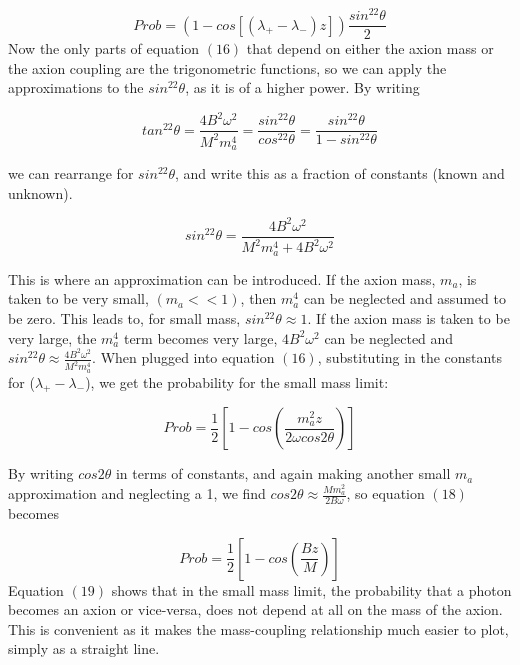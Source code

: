 \documentclass[12pt]{article}
\begin{document}
\begin{equation}
Prob = \left( 1 - cos[(\lambda_+-\lambda_-)z] \right) \frac{sin^22\theta}{2}
\end{equation}
Now the only parts of equation $(16)$ that depend on either the axion mass or the axion coupling are the trigonometric functions, so we can apply the approximations to the $sin^22\theta$, as it is of a higher power. By writing

\begin{equation*}
tan^22\theta = \frac{4B^2\omega^2}{M^2m_a^4} = \frac{sin^22\theta}{cos^22\theta} = \frac{sin^22\theta}{1-sin^22\theta}
\end{equation*}

we can rearrange for $sin^22\theta$, and write this as a fraction of constants (known and unknown). 

\begin{equation}
sin^22\theta = \frac{4B^2\omega^2}{M^2m_a^4+4B^2\omega^2}
\end{equation}

This is where an approximation can be introduced. If the axion mass, $m_a$, is taken to be very small, $(m_a<<1)$, then $m_a^4$ can be neglected and assumed to be zero. This leads to, for small mass, $sin^22\theta \approx 1$. If the axion mass is taken to be very large, the $m_a^4$ term becomes very large, $4B^2\omega^2$ can be neglected and $sin^22\theta \approx \frac{4B^2\omega^2}{M^2m_a^4}$. When plugged into equation $(16)$, substituting in the constants for ($\lambda_+-\lambda_-$), we get the probability for the small mass limit:

\begin{equation}
Prob = \frac{1}{2} \left[ 1-cos\left(\frac{m_a^2z}{2\omega cos2\theta} \right) \right]
\end{equation}

By writing $cos2\theta$ in terms of constants, and again making another small $m_a$ approximation and neglecting a 1, we find $cos2\theta \approx \frac{Mm_a^2}{2B\omega}$, so equation $(18)$ becomes

\begin{equation} Prob = \frac{1}{2} \left[ 1-cos \left(\frac{Bz}{M} \right) \right]
\end{equation}
Equation $(19)$ shows that in the small mass limit, the probability that a photon becomes an axion or vice-versa, does not depend at all on the mass of the axion. This is convenient as it makes the mass-coupling relationship much easier to plot, simply as a straight line.
\end{document}
